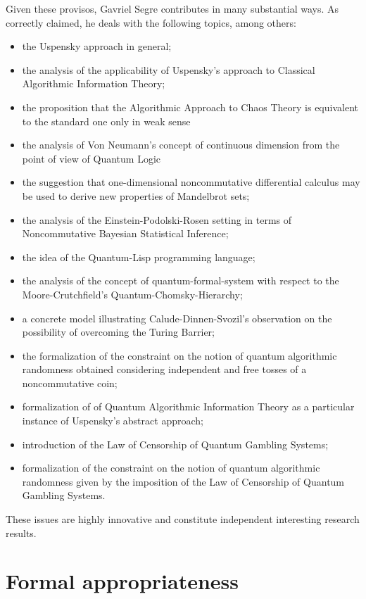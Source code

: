 Given these provisos, Gavriel Segre contributes in many substantial ways.
As correctly claimed, he deals with the following topics, among others:
\begin{itemize}
\item the Uspensky approach in general;
\item the analysis of the applicability of Uspensky's
 approach to  Classical Algorithmic
 Information Theory;
 \item the proposition that the
 Algorithmic Approach to Chaos Theory is equivalent to the
 standard one only in weak sense
\item the analysis of Von Neumann's concept of continuous
dimension from the point of view of Quantum Logic
\item the suggestion  that one-dimensional noncommutative
differential calculus may be used to derive new properties of
Mandelbrot sets;
\item the analysis of the Einstein-Podolski-Rosen setting in
terms of Noncommutative Bayesian Statistical Inference;
 \item the idea  of the Quantum-Lisp programming language;
 \item the analysis of the concept of quantum-formal-system
 with respect to the Moore-Crutchfield's Quantum-Chomsky-Hierarchy;
 \item a concrete model illustrating Calude-Dinnen-Svozil's
 observation on the possibility of overcoming the Turing Barrier;
 \item the formalization of the constraint on the notion of
quantum algorithmic randomness obtained considering independent and free
 tosses of a noncommutative coin;
 \item formalization of  of Quantum Algorithmic
 Information Theory as a particular instance of Uspensky's
 abstract approach;
 \item introduction of the Law of Censorship of Quantum Gambling
 Systems;
 \item formalization of the constraint on the notion of quantum
 algorithmic randomness given by the imposition of the Law of Censorship of Quantum Gambling
 Systems.
\end{itemize}

These issues are highly innovative and constitute independent interesting research results.

\section{Formal appropriateness}

